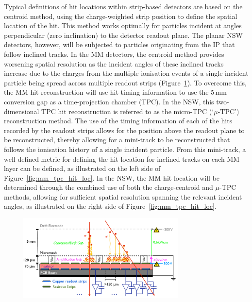 Typical definitions of hit locations within strip-based detectors are based on the
centroid method, using the charge-weighted strip position to define the spatial location
of the hit.
This method works optimally for particles incident at angles perpendicular (zero inclination) to the detector readout plane.
The planar NSW detectors, however, will be subjected to particles originating from the IP that follow inclined tracks.
In the MM detectors, the centroid method provides worsening spatial resolution as the incident angles of these inclined tracks increase due
to the charges from the multiple ionisation events of a single incident particle being spread across multiple readout strips (Figure~\ref{fig:nsw_mm_principle}).
To overcome this, the MM hit reconstruction will use hit timing information
to use the $5$\,mm conversion gap as a time-projection chamber (TPC).
In the NSW, this two-dimensional TPC hit reconstruction is referred to as the micro-TPC (`$\mu$-TPC') reconstruction method.
The use of the timing information of each of the hits recorded by the readout strips
allows for the position above the readout plane to be reconstructed, thereby
allowing for a mini-track to be reconstructed that follows the ionisation history
of a single incident particle.
From this mini-track, a well-defined metric for defining the hit location for inclined tracks on
each MM layer can be defined, as illustrated on the left side of Figure~\ref{fig:mm_tpc_hit_loc}.
In the NSW, the MM hit location will be determined through the combined use of both the
charge-centroid and $\mu$-TPC methods, allowing for sufficient spatial resolution spanning the relevant
incident angles, as illustrated on the right side of Figure~\ref{fig:mm_tpc_hit_loc}.


\begin{figure}[!htb]
    \begin{center}
        \includegraphics[width=0.75\textwidth]{figures/nsw/nsw_mm_principle}
        \caption{
        }
        \label{fig:nsw_mm_principle}
    \end{center}
\end{figure}

